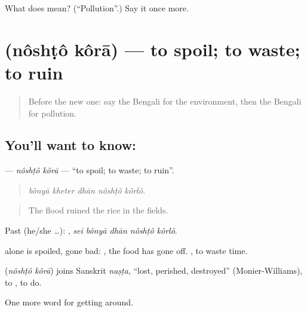 \begin{tcolorbox}[breakable,colback=teal!4,colframe=teal!35!black,title={Before you move on}]
What does  mean? (\textquotedblleft{}Pollution\textquotedblright{}.) Say it once more.
\end{tcolorbox}
\section[\texorpdfstring{\bn{নষ্ট} \bn{করা} (nôshṭô kôrā)}{নষ্ট করা (nôshṭô kôrā)}]{  (nôshṭô kôrā) — to spoil; to waste; to ruin}

\label{lesson:BN-C434-noshto-kora}



\begin{quote}
Before the new one: say the Bengali for the environment, then the Bengali for pollution.
\end{quote}

\subsection*{You'll want to know:  }
\textbf{ } — \emph{nôshṭô kôrā} — \textquotedblleft{}to spoil; to waste; to ruin\textquotedblright{}.

\begin{quote}
    
\end{quote}

\begin{quote}
\emph{bônyā kheter dhān nôshṭô kôrlô.}
\end{quote}

\begin{quote}
The flood ruined the rice in the fields.
\end{quote}

Past (he/she …):     , \emph{sei bônyā dhān nôshṭô kôrlô}.

 alone is spoiled, gone bad:  , the food has gone off.   , to waste time.

\begin{cousinweb}
\textbf{ } (\emph{nôshṭô kôrā}) joins Sanskrit \emph{naṣṭa}, \textquotedblleft{}lost, perished, destroyed\textquotedblright{} (Monier-Williams), to , to do.
\end{cousinweb}

\begin{grammarlens}[title={What you've built}]
One more word for getting around.
\end{grammarlens}

